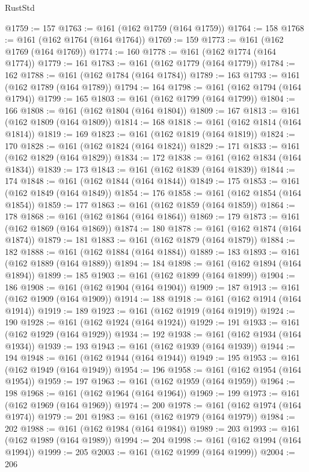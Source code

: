 \begin{lexlean}{RustStd}
\begin{coremodule}
{\begin{coremodule}
{{{{{{{{{{{{{{{{{{{{{{{{{{{{{{{{{{{{{{{{{{{{{{{{{{{{{{{{{{{{@1759 := 157
@1763 := @161 (@162 @1759 (@164 @1759))
@1764 := 158
@1768 := @161 (@162 @1764 (@164 @1764))
@1769 := 159
@1773 := @161 (@162 @1769 (@164 @1769))
@1774 := 160
@1778 := @161 (@162 @1774 (@164 @1774))
@1779 := 161
@1783 := @161 (@162 @1779 (@164 @1779))
@1784 := 162
@1788 := @161 (@162 @1784 (@164 @1784))
@1789 := 163
@1793 := @161 (@162 @1789 (@164 @1789))
@1794 := 164
@1798 := @161 (@162 @1794 (@164 @1794))
@1799 := 165
@1803 := @161 (@162 @1799 (@164 @1799))
@1804 := 166
@1808 := @161 (@162 @1804 (@164 @1804))
@1809 := 167
@1813 := @161 (@162 @1809 (@164 @1809))
@1814 := 168
@1818 := @161 (@162 @1814 (@164 @1814))
@1819 := 169
@1823 := @161 (@162 @1819 (@164 @1819))
@1824 := 170
@1828 := @161 (@162 @1824 (@164 @1824))
@1829 := 171
@1833 := @161 (@162 @1829 (@164 @1829))
@1834 := 172
@1838 := @161 (@162 @1834 (@164 @1834))
@1839 := 173
@1843 := @161 (@162 @1839 (@164 @1839))
@1844 := 174
@1848 := @161 (@162 @1844 (@164 @1844))
@1849 := 175
@1853 := @161 (@162 @1849 (@164 @1849))
@1854 := 176
@1858 := @161 (@162 @1854 (@164 @1854))
@1859 := 177
@1863 := @161 (@162 @1859 (@164 @1859))
@1864 := 178
@1868 := @161 (@162 @1864 (@164 @1864))
@1869 := 179
@1873 := @161 (@162 @1869 (@164 @1869))
@1874 := 180
@1878 := @161 (@162 @1874 (@164 @1874))
@1879 := 181
@1883 := @161 (@162 @1879 (@164 @1879))
@1884 := 182
@1888 := @161 (@162 @1884 (@164 @1884))
@1889 := 183
@1893 := @161 (@162 @1889 (@164 @1889))
@1894 := 184
@1898 := @161 (@162 @1894 (@164 @1894))
@1899 := 185
@1903 := @161 (@162 @1899 (@164 @1899))
@1904 := 186
@1908 := @161 (@162 @1904 (@164 @1904))
@1909 := 187
@1913 := @161 (@162 @1909 (@164 @1909))
@1914 := 188
@1918 := @161 (@162 @1914 (@164 @1914))
@1919 := 189
@1923 := @161 (@162 @1919 (@164 @1919))
@1924 := 190
@1928 := @161 (@162 @1924 (@164 @1924))
@1929 := 191
@1933 := @161 (@162 @1929 (@164 @1929))
@1934 := 192
@1938 := @161 (@162 @1934 (@164 @1934))
@1939 := 193
@1943 := @161 (@162 @1939 (@164 @1939))
@1944 := 194
@1948 := @161 (@162 @1944 (@164 @1944))
@1949 := 195
@1953 := @161 (@162 @1949 (@164 @1949))
@1954 := 196
@1958 := @161 (@162 @1954 (@164 @1954))
@1959 := 197
@1963 := @161 (@162 @1959 (@164 @1959))
@1964 := 198
@1968 := @161 (@162 @1964 (@164 @1964))
@1969 := 199
@1973 := @161 (@162 @1969 (@164 @1969))
@1974 := 200
@1978 := @161 (@162 @1974 (@164 @1974))
@1979 := 201
@1983 := @161 (@162 @1979 (@164 @1979))
@1984 := 202
@1988 := @161 (@162 @1984 (@164 @1984))
@1989 := 203
@1993 := @161 (@162 @1989 (@164 @1989))
@1994 := 204
@1998 := @161 (@162 @1994 (@164 @1994))
@1999 := 205
@2003 := @161 (@162 @1999 (@164 @1999))
@2004 := 206
}}}}}}}}}}}}}}}}}}}}}}}}}}}}}}}}}}}}}}}}}}}}}}}}}}}}}}}}}}}}
\end{coremodule}}
\end{coremodule}
\end{lexlean}
